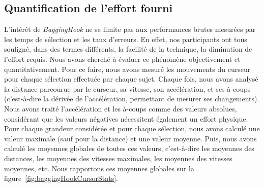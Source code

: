 	\subsection{Quantification de l'effort fourni}
	L'intérêt de \emph{BaggingHook} ne se limite pas aux performances brutes mesurées par les temps de sélection et les taux d'erreurs. En effet, nos participants ont tous souligné, dans des termes différents, la \og facilité \fg{} de la technique, la diminution de l'effort requis. Nous avons cherché à évaluer ce phénomène objectivement et quantitativement. Pour ce faire, nous avons mesuré les mouvements du curseur pour chaque sélection effectuée par chaque sujet. Chaque fois, nous avons analysé la distance parcourue par le curseur, sa vitesse, son accélération, et ses à-coups (c'est-à-dire la dérivée de l'accélération, permettant de mesurer ses changements). Nous avons traité l'accélération et les à-coups comme des valeurs absolues, considérant que les valeurs négatives nécessitent également un effort physique. Pour chaque grandeur considérée et pour chaque sélection, nous avons calculé une valeur maximale (sauf pour la distance) et une valeur moyenne. Puis, nous avons calculé les moyennes globales de toutes ces valeurs, c'est-à-dire les moyennes des distances, les moyennes des vitesses maximales, les moyennes des vitesses moyennes, etc. Nous rapportons ces moyennes globales sur la figure~\ref{fig:baggingHookCursorStats}.


